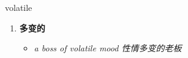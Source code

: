 
\begin{frame}
{\huge volatile}
\begin{center}
\begin{enumerate}\Large
  \item \textbf{多变的}
  \begin{itemize}
    \item \em{\Large{a boss of volatile mood 性情多变的老板}}
  \end{itemize}
\end{enumerate}
\end{center}
\end{frame}
